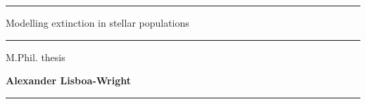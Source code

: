 \documentclass[12pt, a4paper]{report}
\begin{document}
\begin{titlepage}

\vspace*{-0.4cm}

\begin{center}
\hrule
\vspace*{0.5cm}
{\Huge \sc Modelling extinction in stellar populations \par}
\vspace*{0.5cm}
\hrule

\vspace*{5mm}
{\normalsize M.Phil. thesis}

\vfill

{\bf Alexander Lisboa-Wright}

\end{center}

\vspace*{1.0cm}

\hrule
\vspace*{0.2cm}
\\

\end{titlepage}

\begin{abstract}
\end{abstract}
\end{document}
